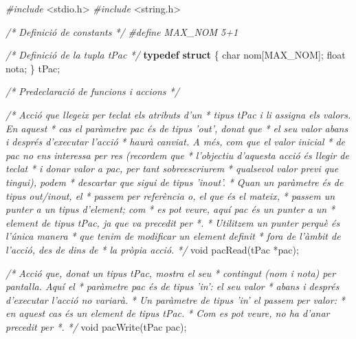 \documentclass[]{book}
\newenvironment{Shaded}{\begin{snugshade}}{\end{snugshade}}
\newcommand{\KeywordTok}[1]{\textcolor[rgb]{0.13,0.29,0.53}{\textbf{#1}}}
\newcommand{\DataTypeTok}[1]{\textcolor[rgb]{0.13,0.29,0.53}{#1}}
\newcommand{\ImportTok}[1]{#1}
\newcommand{\CommentTok}[1]{\textcolor[rgb]{0.56,0.35,0.01}{\textit{#1}}}
\newcommand{\PreprocessorTok}[1]{\textcolor[rgb]{0.56,0.35,0.01}{\textit{#1}}}
\newcommand{\NormalTok}[1]{#1}
\begin{document}
\begin{Shaded}
\begin{Highlighting}[]
\PreprocessorTok{#include }\ImportTok{<stdio.h>}
\PreprocessorTok{#include }\ImportTok{<string.h>}

\CommentTok{/* Definició de constants */}
\PreprocessorTok{#define MAX_NOM 5+1}

\CommentTok{/* Definició de la tupla tPac */}
\KeywordTok{typedef} \KeywordTok{struct}\NormalTok{ \{}
    \DataTypeTok{char}\NormalTok{ nom[MAX_NOM];}
    \DataTypeTok{float}\NormalTok{ nota;}
\NormalTok{\} tPac;}

\CommentTok{/* Predeclaració de funcions i accions */}

\CommentTok{/* Acció que llegeix per teclat els atributs d'un }
\CommentTok{ * tipus tPac i li assigna els valors. En aquest}
\CommentTok{ * cas el paràmetre pac és de tipus 'out', donat que }
\CommentTok{ * el seu valor abans i després d'executar l'acció}
\CommentTok{ * haurà canviat. A més, com que el valor inicial}
\CommentTok{ * de pac no ens interessa per res (recordem que}
\CommentTok{ * l'objectiu d'aquesta acció és llegir de teclat}
\CommentTok{ * i donar valor a pac, per tant sobreescriurem }
\CommentTok{ * qualsevol valor previ que tingui), podem }
\CommentTok{ * descartar que sigui de tipus 'inout'.}
\CommentTok{ * Quan un paràmetre és de tipus out/inout, el }
\CommentTok{ * passem per referència o, el que és el mateix,}
\CommentTok{ * passem un punter a un tipus d'element; com }
\CommentTok{ * es pot veure, aquí pac és un punter a un }
\CommentTok{ * element de tipus tPac, ja que va precedit per *.}
\CommentTok{ * Utilitzem un punter perquè és l'única manera}
\CommentTok{ * que tenim de modificar un element definit}
\CommentTok{ * fora de l'àmbit de l'acció, des de dins de }
\CommentTok{ * la pròpia acció.}
\CommentTok{ */}
\DataTypeTok{void}\NormalTok{ pacRead(tPac *pac);}

\CommentTok{/* Acció que, donat un tipus tPac, mostra el seu }
\CommentTok{ * contingut (nom i nota) per pantalla. Aquí el }
\CommentTok{ * paràmetre pac és de tipus 'in': el seu valor}
\CommentTok{ * abans i després d'executar l'acció no variarà.}
\CommentTok{ * Un paràmetre de tipus 'in' el passem per valor: }
\CommentTok{ * en aquest cas és un element de tipus tPac. }
\CommentTok{ * Com es pot veure, no ha d'anar precedit per *.}
\CommentTok{ */}
\DataTypeTok{void}\NormalTok{ pacWrite(tPac pac);}


\end{Highlighting}
\end{Shaded}
\end{document}
